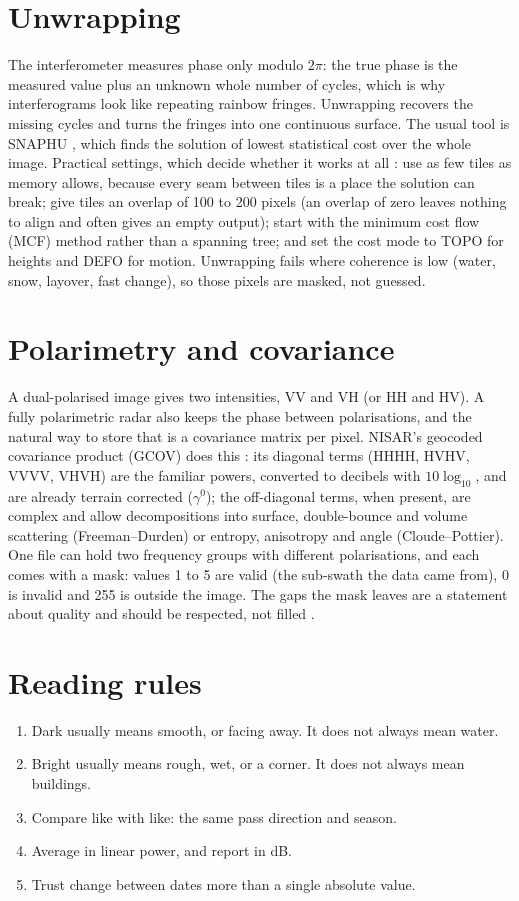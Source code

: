 \section{Unwrapping}
The interferometer measures phase only modulo $2\pi$: the true phase is the measured value plus an unknown whole number of cycles, which is why interferograms look like repeating rainbow fringes. Unwrapping recovers the missing cycles and turns the fringes into one continuous surface. The usual tool is SNAPHU \cite{chen2001snaphu}, which finds the solution of lowest statistical cost over the whole image. Practical settings, which decide whether it works at all \cite{shah2026snaphu}: use as few tiles as memory allows, because every seam between tiles is a place the solution can break; give tiles an overlap of 100 to 200 pixels (an overlap of zero leaves nothing to align and often gives an empty output); start with the minimum cost flow (MCF) method rather than a spanning tree; and set the cost mode to TOPO for heights and DEFO for motion. Unwrapping fails where coherence is low (water, snow, layover, fast change), so those pixels are masked, not guessed.

\section{Polarimetry and covariance}
A dual-polarised image gives two intensities, VV and VH (or HH and HV). A fully polarimetric radar also keeps the phase between polarisations, and the natural way to store that is a covariance matrix per pixel. NISAR's geocoded covariance product (GCOV) does this \cite{shiroma2024gcov}: its diagonal terms (HHHH, HVHV, VVVV, VHVH) are the familiar powers, converted to decibels with $10\log_{10}$, and are already terrain corrected ($\gamma^0$); the off-diagonal terms, when present, are complex and allow decompositions into surface, double-bounce and volume scattering (Freeman--Durden) or entropy, anisotropy and angle (Cloude--Pottier). One file can hold two frequency groups with different polarisations, and each comes with a mask: values 1 to 5 are valid (the sub-swath the data came from), 0 is invalid and 255 is outside the image. The gaps the mask leaves are a statement about quality and should be respected, not filled \cite{shah2026gcov}.

\section{Reading rules}
\begin{enumerate}
\item Dark usually means smooth, or facing away. It does not always mean water.
\item Bright usually means rough, wet, or a corner. It does not always mean buildings.
\item Compare like with like: the same pass direction and season.
\item Average in linear power, and report in dB.
\item Trust change between dates more than a single absolute value.
\end{enumerate}
